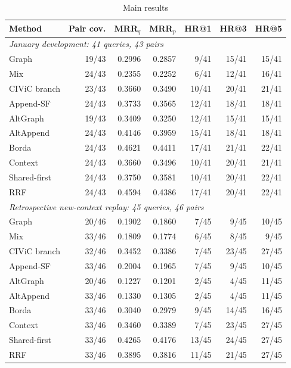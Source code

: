 \begin{table}[t]
\centering
\caption{Main results}
\label{tab:main}
\small
\setlength{\tabcolsep}{3pt}
\begin{tabular}{lrrrrrr}
\toprule
Method & Pair cov. & MRR$_q$ & MRR$_p$ & HR@1 & HR@3 & HR@5 \\
\midrule
\multicolumn{7}{l}{\textit{January development: 41 queries, 43 pairs}} \\
Graph & 19/43 & 0.2996 & 0.2857 & 9/41 & 15/41 & 15/41 \\
Mix & 24/43 & 0.2355 & 0.2252 & 6/41 & 12/41 & 16/41 \\
CIViC branch & 23/43 & 0.3660 & 0.3490 & 10/41 & 20/41 & 21/41 \\
Append-SF & 24/43 & 0.3733 & 0.3565 & 12/41 & 18/41 & 18/41 \\
AltGraph & 19/43 & 0.3409 & 0.3250 & 12/41 & 15/41 & 15/41 \\
AltAppend & 24/43 & 0.4146 & 0.3959 & 15/41 & 18/41 & 18/41 \\
Borda & 24/43 & 0.4621 & 0.4411 & 17/41 & 21/41 & 22/41 \\
Context & 24/43 & 0.3660 & 0.3496 & 10/41 & 20/41 & 21/41 \\
Shared-first & 24/43 & 0.3750 & 0.3581 & 10/41 & 20/41 & 22/41 \\
RRF & 24/43 & 0.4594 & 0.4386 & 17/41 & 20/41 & 22/41 \\
\midrule
\multicolumn{7}{l}{\textit{Retrospective new-context replay: 45 queries, 46 pairs}} \\
Graph & 20/46 & 0.1902 & 0.1860 & 7/45 & 9/45 & 10/45 \\
Mix & 33/46 & 0.1809 & 0.1774 & 6/45 & 8/45 & 9/45 \\
CIViC branch & 32/46 & 0.3452 & 0.3386 & 7/45 & 23/45 & 27/45 \\
Append-SF & 33/46 & 0.2004 & 0.1965 & 7/45 & 9/45 & 10/45 \\
AltGraph & 20/46 & 0.1227 & 0.1201 & 2/45 & 4/45 & 11/45 \\
AltAppend & 33/46 & 0.1330 & 0.1305 & 2/45 & 4/45 & 11/45 \\
Borda & 33/46 & 0.3040 & 0.2979 & 9/45 & 14/45 & 16/45 \\
Context & 33/46 & 0.3460 & 0.3389 & 7/45 & 23/45 & 27/45 \\
Shared-first & 33/46 & 0.4265 & 0.4176 & 13/45 & 24/45 & 27/45 \\
RRF & 33/46 & 0.3895 & 0.3816 & 11/45 & 21/45 & 27/45 \\
\bottomrule
\end{tabular}
\end{table}

